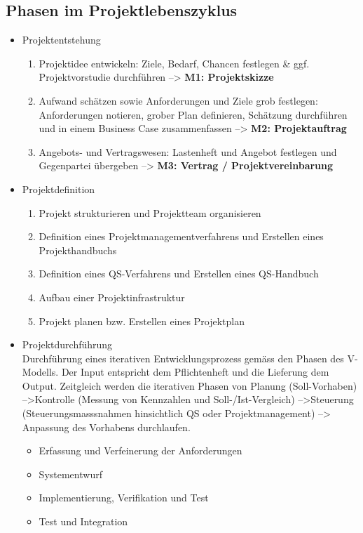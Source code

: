 \subsection{Phasen im Projektlebenszyklus}
\begin{itemize}
	\item Projektentstehung
	\begin{enumerate}
		\item Projektidee entwickeln: Ziele, Bedarf, Chancen festlegen \& ggf. Projektvorstudie durchführen -->
		\textbf{M1: Projektskizze} 
		\item Aufwand schätzen sowie Anforderungen und Ziele grob festlegen: Anforderungen notieren, grober Plan definieren, Schätzung durchführen und in einem Business Case zusammenfassen -->
		\textbf{M2: Projektauftrag}
		\item Angebots- und Vertragswesen: Lastenheft und Angebot festlegen und Gegenpartei übergeben -->
		\textbf{M3: Vertrag / Projektvereinbarung}
	\end{enumerate}
	\item Projektdefinition
	\begin{enumerate}
		\item Projekt strukturieren und Projektteam organisieren
		\item Definition eines Projektmanagementverfahrens und Erstellen eines Projekthandbuchs
		\item Definition eines QS-Verfahrens und Erstellen eines QS-Handbuch
		\item Aufbau einer Projektinfrastruktur
		\item Projekt planen bzw. Erstellen eines Projektplan
	\end{enumerate}
	\item Projektdurchführung \\
	Durchführung eines iterativen Entwicklungsprozess gemäss den Phasen des V-Modells. Der Input entspricht dem Pflichtenheft und die Lieferung dem Output. Zeitgleich werden die iterativen Phasen von Planung (Soll-Vorhaben) -->Kontrolle  (Messung von Kennzahlen und Soll-/Ist-Vergleich) -->Steuerung (Steuerungsmasssnahmen hinsichtlich QS oder Projektmanagement) --> Anpassung des Vorhabens durchlaufen. 
	\begin{itemize}
		\item Erfassung und Verfeinerung der Anforderungen
		\item Systementwurf
		\item Implementierung, Verifikation und Test
		\item Test und Integration

\end{itemize}
\end{itemize}
